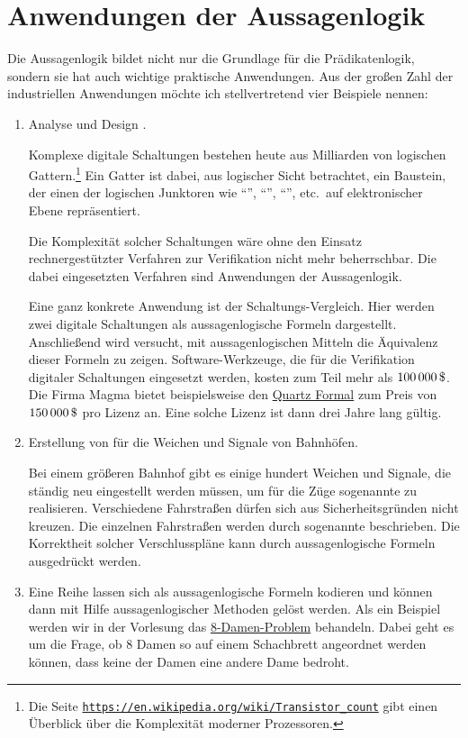 \section{Anwendungen der Aussagenlogik}
Die Aussagenlogik bildet nicht nur die Grundlage für die Prädikatenlogik, sondern sie hat auch wichtige prak\-tische
Anwendungen.  Aus der großen Zahl der industriellen Anwendungen möchte ich stellvertretend vier Beispiele nennen:
\begin{enumerate}
\item Analyse und Design .

      Komplexe digitale Schaltungen bestehen heute aus Milliarden von logischen Gattern.\footnote{Die Seite 
      \href{https://en.wikipedia.org/wiki/Transistor_count}{\texttt{https://en.wikipedia.org/wiki/Transistor\_count}}
      gibt einen Überblick über die Komplexität moderner Prozessoren.}
      Ein Gatter ist dabei, aus logischer Sicht betrachtet, ein Baustein, der einen
      der logischen Junktoren wie ``'', ``'', ``'',
      etc.~auf elektronischer Ebene repräsentiert. 
  
      Die Komplexität solcher Schaltungen wäre ohne den Einsatz
      rechnergestützter Verfahren zur Verifikation nicht mehr beherrschbar.  Die
      dabei eingesetzten Verfahren sind Anwendungen der Aussagenlogik. 

      Eine ganz konkrete Anwendung ist der Schaltungs-Vergleich.  Hier werden zwei
      digitale Schaltungen als aussagenlogische Formeln dargestellt.
      Anschließend wird versucht, mit aussagenlogischen Mitteln die Äquivalenz dieser
      Formeln zu zeigen. Software-Werkzeuge, die für die Verifikation digitaler
      Schaltungen eingesetzt werden, kosten zum Teil mehr als $100\,000\,\symbol{36}$.
      Die Firma Magma bietet beispielsweise den 
      \href{https://www.eetimes.com/document.asp?doc_id=1217672}{Quartz Formal} zum Preis
      von $150\,000\,
      \symbol{36}$ pro Lizenz an.  Eine solche Lizenz ist dann drei Jahre lang gültig.
\item Erstellung von  für die Weichen und Signale von Bahnhöfen.

      Bei einem größeren Bahnhof gibt es einige hundert Weichen und Signale, die ständig
      neu eingestellt werden müssen, um für die Züge sogenannte  zu
      realisieren.  Verschiedene Fahrstraßen dürfen sich aus Sicherheitsgründen nicht kreuzen.  
      Die einzelnen Fahrstraßen werden durch sogenannte  beschrieben.
      Die Korrektheit solcher Verschlusspläne kann durch aussagenlogische Formeln ausgedrückt werden.
\item Eine Reihe  lassen sich als aussagenlogische Formeln
      kodieren und können dann mit Hilfe aussagenlogischer Methoden gelöst werden.  Als ein
      Beispiel werden wir in der Vorlesung das 
      \href{https://en.wikipedia.org/wiki/Eight_queens_puzzle}{8-Damen-Problem} behandeln.  Dabei
      geht es um die Frage, ob 8 Damen so auf einem Schachbrett angeordnet werden können, dass
      keine der Damen eine andere Dame bedroht.
\end{enumerate}


